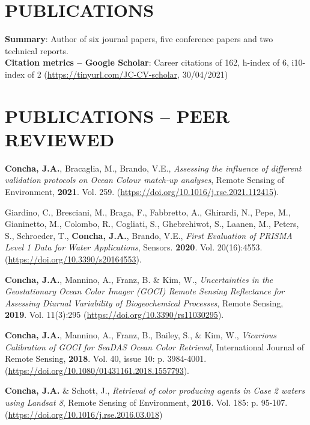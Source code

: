 \documentclass[11pt]{res}
\begin{document}
\begin{resume}
\section{PUBLICATIONS}
{\bf Summary}: Author of six journal papers, five conference papers and two technical reports.\\
{\bf Citation metrics -- Google Scholar}: Career citations of 162, h-index of 6, i10-index of 2 (\url{https://tinyurl.com/JC-CV-scholar}, 30/04/2021)\\
\vspace{-0.3in}   
\section{PUBLICATIONS -- PEER REVIEWED}
\vspace{0.05in}
{\bf Concha, J.A.}, Bracaglia, M., Brando, V.E., {\it Assessing the influence of different validation protocols on Ocean Colour match-up analyses}, Remote Sensing of Environment, {\bf 2021}.  Vol. 259. (\url{https://doi.org/10.1016/j.rse.2021.112415}).

Giardino, C., Bresciani, M., Braga, F., Fabbretto, A., Ghirardi, N., Pepe, M., Gianinetto, M., Colombo, R., Cogliati, S., Ghebrehiwot, S., Laanen, M., Peters, S., Schroeder, T., {\bf Concha, J.A.}, Brando, V.E., {\it First Evaluation of PRISMA Level 1 Data for Water Applications}, Sensors. {\bf 2020}. Vol. 20(16):4553. (\url{https://doi.org/10.3390/s20164553}).

{\bf Concha, J.A.}, Mannino, A., Franz, B. $\&$ Kim, W., {\it Uncertainties in the Geostationary Ocean Color Imager (GOCI) Remote Sensing Reflectance for Assessing Diurnal Variability of Biogeochemical Processes}, Remote Sensing, {\bf 2019}. Vol. 11(3):295 (\url{https://doi.org/10.3390/rs11030295}).

{\bf Concha, J.A.}, Mannino, A., Franz, B., Bailey, S., $\&$ Kim, W., {\it Vicarious Calibration of GOCI for SeaDAS Ocean Color Retrieval}, International Journal of Remote Sensing, {\bf 2018}. Vol. 40, issue 10: p. 3984-4001. (\url{https://doi.org/10.1080/01431161.2018.1557793}).

{\bf Concha, J.A.} $\&$ Schott, J., {\it Retrieval of color producing agents in Case 2 waters using Landsat 8}, Remote Sensing of Environment, {\bf 2016}. Vol. 185: p. 95-107. (\url{https://doi.org/10.1016/j.rse.2016.03.018})


\end{resume}
\end{document}
